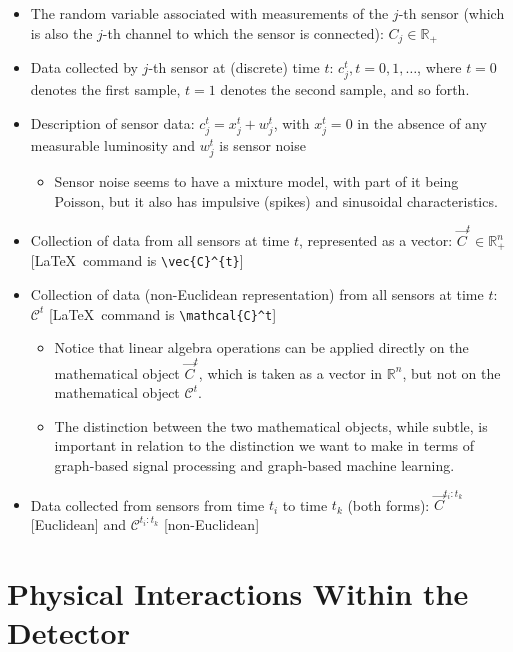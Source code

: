 \documentclass[]{article}
\providecommand{\tightlist}{%
  \setlength{\itemsep}{0pt}\setlength{\parskip}{0pt}}
\begin{document}
\begin{itemize}
\tightlist
\item
    The random variable associated with measurements of the $j$-th sensor (which is also the $j$-th channel to which the sensor is connected): $C_j \in \mathbb{R}_+$

\item
  Data collected by \(j\)-th sensor at (discrete) time \(t\):
  \(c_j^t, t=0,1,\dots\), where \(t = 0\) denotes the first sample, \(t=1\) denotes the second sample, and so forth.
\item
  Description of sensor data: \(c_j^t = x_j^t + w_j^t\), with \(x_j^t = 0\) in the absence of any measurable luminosity and \(w_j^t\) is sensor noise

  \begin{itemize}
  \tightlist
  \item
    Sensor noise seems to have a mixture model, with part of it being Poisson, but it also has impulsive (spikes) and sinusoidal characteristics.
  \end{itemize}
\item
  Collection of data from all sensors at time \(t\), represented as a vector:
  \(\vec{C}^{t} \in \mathbb{R}_+^n\) {[}{\color{blue}\LaTeX~command is \verb|\vec{C}^{t}|}{]}
\item
  Collection of data (non-Euclidean representation) from all sensors at time \(t\):
  \(\mathcal{C}^t\) {[}{\color{blue}\LaTeX~command is \verb|\mathcal{C}^t|}{]}
  \begin{itemize}
  \tightlist
  \item
    Notice that linear algebra operations can be applied directly on the mathematical object \(\vec{C}^{t}\), which is taken as a vector in \(\mathbb{R}^n\), but not on the mathematical object \(\mathcal{C}^t\).
  \item
    The distinction between the two mathematical objects, while subtle, is important in relation to the distinction we want to make in terms of graph-based signal processing and graph-based machine learning.
  \end{itemize}
\item
  Data collected from sensors from time \(t_i\) to time \(t_k\) (both forms):
  \(\vec{{C}}^{t_i:t_k}\) {[}Euclidean{]} and
  \(\mathcal{C}^{t_i:t_k}\) {[}non-Euclidean{]}
\end{itemize}


\section{Physical Interactions Within the Detector}
\end{document}
